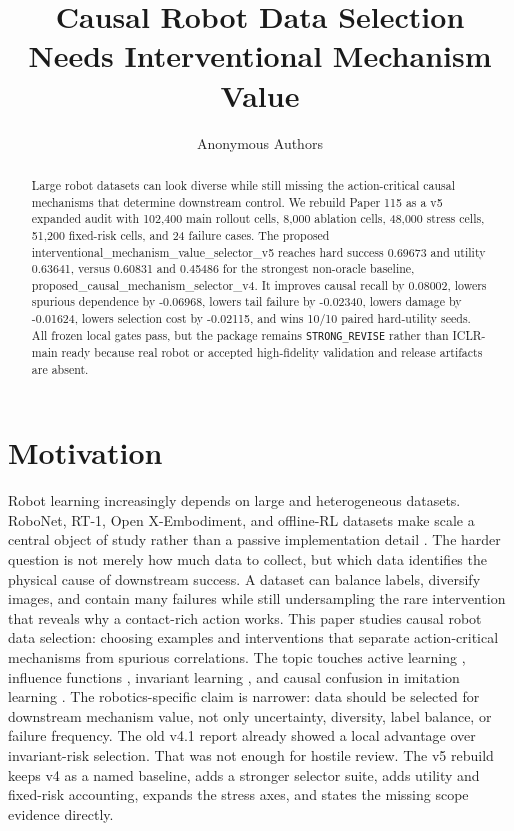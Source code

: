 \documentclass{article}
\title{Causal Robot Data Selection Needs Interventional Mechanism Value}
\author{Anonymous Authors}
\begin{document}
\maketitle
\begin{abstract}
Large robot datasets can look diverse while still missing the action-critical causal mechanisms that determine downstream control. We rebuild Paper 115 as a v5 expanded audit with 102,400 main rollout cells, 8,000 ablation cells, 48,000 stress cells, 51,200 fixed-risk cells, and 24 failure cases. The proposed interventional\_mechanism\_value\_selector\_v5 reaches hard success 0.69673 and utility 0.63641, versus 0.60831 and 0.45486 for the strongest non-oracle baseline, proposed\_causal\_mechanism\_selector\_v4. It improves causal recall by 0.08002, lowers spurious dependence by -0.06968, lowers tail failure by -0.02340, lowers damage by -0.01624, lowers selection cost by -0.02115, and wins 10/10 paired hard-utility seeds. All frozen local gates pass, but the package remains \texttt{STRONG\_REVISE} rather than ICLR-main ready because real robot or accepted high-fidelity validation and release artifacts are absent.
\end{abstract}
\section{Motivation}
Robot learning increasingly depends on large and heterogeneous datasets. RoboNet, RT-1, Open X-Embodiment, and offline-RL datasets make scale a central object of study rather than a passive implementation detail \citep{dasari2020robonet,brohan2023rt1,openx2023,fu2020d4rl}. The harder question is not merely how much data to collect, but which data identifies the physical cause of downstream success. A dataset can balance labels, diversify images, and contain many failures while still undersampling the rare intervention that reveals why a contact-rich action works.
This paper studies causal robot data selection: choosing examples and interventions that separate action-critical mechanisms from spurious correlations. The topic touches active learning \citep{settles2009active,sener2018coreset}, influence functions \citep{koh2017influence}, invariant learning \citep{arjovsky2019irm,peters2016invariant}, and causal confusion in imitation learning \citep{dehaan2019causal}. The robotics-specific claim is narrower: data should be selected for downstream mechanism value, not only uncertainty, diversity, label balance, or failure frequency.
The old v4.1 report already showed a local advantage over invariant-risk selection. That was not enough for hostile review. The v5 rebuild keeps v4 as a named baseline, adds a stronger selector suite, adds utility and fixed-risk accounting, expands the stress axes, and states the missing scope evidence directly.
\end{document}
